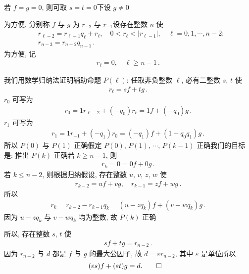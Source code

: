 \begin{pf}
    若 $f=g=0$, 则可取 $s=t=0$\period 下设 $g \neq 0$\period

    为方便, 分别称 $f$ 与 $g$ 为 $r_{-2}$ 与 $r_{-1}$\period 设存在整数 $n$ 使
    \begin{align*}
         & r_{\ell - 2} = r_{\ell - 1} q_{\ell} + r_{\ell}, \quad 0 < r_{\ell} < |r_{\ell - 1}|, \quad \ell = 0,1,\cdots,n-2; \\
         & r_{n - 3} = r_{n - 2} q_{n - 1} \period
    \end{align*}
    为方便, 记
    \begin{align*}
        r_{\ell} = 0, \quad \ell \geq n - 1 \period
    \end{align*}

    我们用数学归纳法证明辅助命题 $P(\ell)$: 任取非负整数 $\ell$, 必有二整数 $s$, $t$ 使
    \begin{align*}
        r_\ell = sf + tg \period
    \end{align*}
    $r_0$ 可写为
    \begin{align*}
        r_0 = 1 r_{\ell - 2} + (-q_0) r_{\ell} = 1f + (-q_0)g \period
    \end{align*}
    $r_1$ 可写为
    \begin{align*}
        r_1 = 1r_{-1} + (-q_1) r_0 = (-q_1) f + (1 + q_0 q_1) g \period
    \end{align*}
    所以 $P(0)$ 与 $P(1)$ 正确\period 假定 $P(0)$, $P(1)$, $\cdots$, $P(k-1)$ 正确\period 我们的目标是: 推出 $P(k)$ 正确\period 若 $k \geq n-1$, 则
    \begin{align*}
        r_k = 0 = 0f + 0g \period
    \end{align*}
    若 $k \leq n-2$, 则根据归纳假设, 存在整数 $u$, $v$, $z$, $w$ 使
    \begin{align*}
        r_{k-2} = uf + vg, \quad r_{k-1} = zf + wg \period
    \end{align*}
    所以
    \begin{align*}
        r_{k} = r_{k-2} - r_{k-1} q_k = (u - zq_k) f + (v - wq_k) g \period
    \end{align*}
    因为 $u - zq_k$ 与 $v - wq_k$ 均为整数, 故 $P(k)$ 正确\period

    所以, 存在整数 $s$, $t$ 使
    \begin{align*}
        sf + tg = r_{n-2} \period
    \end{align*}
    因为 $r_{n-2}$ 与 $d$ 都是 $f$ 与 $g$ 的最大公因子, 故 $d = \varepsilon r_{n-2}$, 其中 $\varepsilon$ 是单位\period 所以
    \begin{align*}
         & (\varepsilon s)f + (\varepsilon t)g = d . \qedhere
    \end{align*}
\end{pf}

